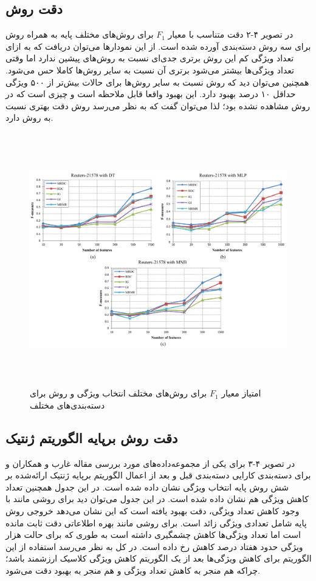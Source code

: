 \subsection{دقت روش }
در تصویر ۴-۲ دقت متناسب با معیار $F_1$ برای روش‌های مختلف پایه به همراه روش  برای سه روش دسته‌بندی آورده شده است. از این نمودارها می‌توان دریافت که به ازای تعداد ویژگی کم این روش برتری جدی‌ای نسبت به روش‌های پیشین ندارد اما وقتی تعداد ویژگی‌ها بیشتر می‌شود برتری آن نسبت به سایر روش‌ها کاملا حس می‌شود. همچنین می‌توان دید که روش  نسبت به سایر روش‌ها برای حالات بیش‌تر از ۵۰۰ ویژگی حداقل ۱۰ درصد بهبود دارد. این بهبود واقعا قابل ملاحظه است و چیزی است که در روش  مشاهده نشده بود؛ لذا می‌توان گفت که به نظر می‌رسد روش  دقت بهتری نسبت به روش  دارد.

\begin{figure}[!h]
\includegraphics[height=11cm]{MRDC1.png}
\caption{امتیاز معیار $F_1$ برای روش‌های مختلف انتخاب ویژگی و روش  برای دسته‌بندی‌های مختلف \cite{labani2018novel} }
\end{figure}

\subsection{دقت روش برپایه الگوریتم ژنتیک}
در تصویر ۴-۳ برای یکی از مجموعه‌داده‌های مورد بررسی مقاله غارب و همکاران و برای دسته‌بندی  کارایی دسته‌بندی قبل و بعد از اعمال الگوریتم برپایه ژنتیک ارائه‌شده بر شش روش پایه انتخاب ویژگی نشان داده شده است. در این جدول همچنین تعداد کاهش ویژگی هم نشان داده شده است. در این جدول می‌توان دید برای روشی مانند  با وجود کاهش تعداد ویژگی، دقت بهبود یافته است که این نشان می‌دهد خروجی روش پایه شامل تعدادی ویژگی زائد است. برای روشی مانند بهره اطلاعاتی دقت ثابت مانده است اما تعداد ویژگی‌ها کاهش چشمگیری داشته است به طوری که برای حالت هزار ویژگی حدود هفتاد درصد کاهش رخ داده است. در کل به نظر می‌رسد استفاده از این الگوریتم برای کاهش ویژگی‌ها بعد از یک الگوریتم کاهش ویژگی کلاسیک ارزشمند باشد؛ چراکه هم منجر به کاهش تعداد ویژگی‌ و هم منجر به بهبود دقت می‌شود.
\\


